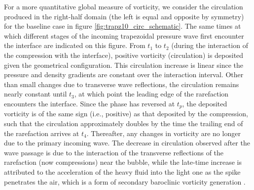 For a more quantitative global measure of vorticity, we consider the
circulation produced in the right-half domain (the left is equal and
opposite by symmetry) for the baseline case in figure
\ref{fig:trapz10_circ_schematic}. The same times at which different
stages of the incoming trapezoidal pressure wave first encounter the
interface are indicated on this figure. From $t_1$ to $t_2$ (during
the interaction of the compression with the interface), positive
vorticity (circulation) is deposited given the geometrical
configuration. This circulation increase is linear since the pressure
and density gradients are constant over the interaction
interval. Other than small changes due to transverse wave reflections,
the circulation remains nearly constant until $t_3$, at which point the
leading edge of the rarefaction encounters the interface. Since the
phase has reversed at $t_p$, the deposited vorticity is of the same
sign (i.e., positive) as that deposited by the compression, such that
the circulation approximately doubles by the time the trailing end of the
rarefaction arrives at $t_4$. Thereafter, any changes in vorticity are
no longer due to the primary incoming wave. The decrease in
circulation observed after the wave passage is due to the interaction
of the transverse reflections of the rarefaction (now compressions)
near the bubble, while the late-time increase is attributed to the
acceleration of the heavy fluid into the light one as the spike
penetrates the air, which is a form of secondary baroclinic vorticity
generation \citep{Peng2003}.

